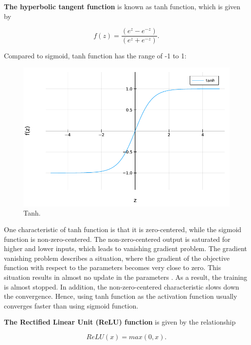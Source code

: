 \documentclass[
	parskip, 			   %
	twoside, 			   %
	DIV=14, 			   %
	BCOR=15.0mm, 		   %
	headsepline, 		   %
	open=right, 		   %
	captions=tableheading, %
	bibliography=totoc,    %
	numbers=noenddot       %
]{scrreprt}
\begin{document}
\textbf{The hyperbolic tangent function} is known as tanh function, which is given by

\begin{equation}
    \label{eq:tanh}
    f(z)=\frac{\left(e^{z}-e^{-z}\right)}{\left(e^{z}+e^{-z}\right)}.
\end{equation}

Compared to sigmoid, tanh function has the range of -1 to 1:

\begin{figure}[h!]
    \centering
    \includegraphics[scale=0.7]{figures/tanh.pdf}
    \caption{Tanh.}
    \label{fig:tanh}
\end{figure}

One characteristic of tanh function is that it is zero-centered, while the sigmoid function is non-zero-centered. The non-zero-centered output is saturated for higher and lower inputs, which leads to vanishing gradient problem. The gradient vanishing problem describes a situation, where the gradient of the objective function with respect to the parameters becomes very close to zero. This situation results in almost no update in the parameters \cite{dubey2022activation}. As a result, the training is almost stopped. In addition, the non-zero-centered characteristic slows down the convergence. Hence, using tanh function as the activation function usually converges faster than using sigmoid function.

\textbf{The Rectified Linear Unit (ReLU) function} is given by the relationship

\begin{equation}
    \label{eq:ReLU}
    ReLU(x) = max(0,x).
\end{equation}
\end{document}
